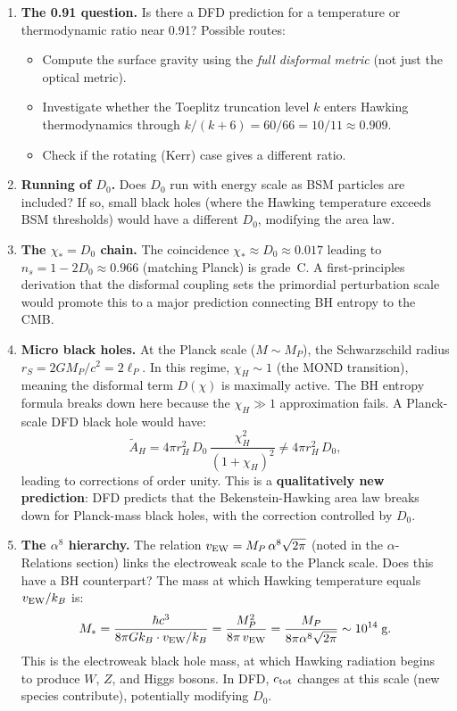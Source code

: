 \documentclass[11pt,a4paper]{article}
\begin{document}
\begin{enumerate}
\item \textbf{The 0.91 question.} Is there a DFD prediction for a temperature or thermodynamic ratio near 0.91? Possible routes:
\begin{itemize}
\item Compute the surface gravity using the \emph{full disformal metric} (not just the optical metric).
\item Investigate whether the Toeplitz truncation level $k$ enters Hawking thermodynamics through $k/(k+6) = 60/66 = 10/11 \approx 0.909$.
\item Check if the rotating (Kerr) case gives a different ratio.
\end{itemize}

\item \textbf{Running of $D_0$.} Does $D_0$ run with energy scale as BSM particles are included? If so, small black holes (where the Hawking temperature exceeds BSM thresholds) would have a different $D_0$, modifying the area law.

\item \textbf{The $\chi_* = D_0$ chain.} The coincidence $\chi_* \approx D_0 \approx 0.017$ leading to $n_s = 1 - 2D_0 \approx 0.966$ (matching Planck) is grade~C. A first-principles derivation that the disformal coupling sets the primordial perturbation scale would promote this to a major prediction connecting BH entropy to the CMB.

\item \textbf{Micro black holes.} At the Planck scale ($M \sim M_P$), the Schwarzschild radius $r_S = 2GM_P/c^2 = 2\ell_P$. In this regime, $\chi_H \sim 1$ (the MOND transition), meaning the disformal term $D(\chi)$ is maximally active. The BH entropy formula breaks down here because the $\chi_H \gg 1$ approximation fails. A Planck-scale DFD black hole would have:
\begin{equation}
\tilde{A}_H = 4\pi r_H^2\,D_0\,\frac{\chi_H^2}{(1+\chi_H)^2} \neq 4\pi r_H^2\,D_0,
\end{equation}
leading to corrections of order unity. This is a \textbf{qualitatively new prediction}: DFD predicts that the Bekenstein-Hawking area law breaks down for Planck-mass black holes, with the correction controlled by $D_0$.

\item \textbf{The $\alpha^8$ hierarchy.} The relation $v_{\rm EW} = M_P\,\alpha^8\sqrt{2\pi}$ (noted in the $\alpha$-Relations section) links the electroweak scale to the Planck scale. Does this have a BH counterpart? The mass at which Hawking temperature equals $v_{\rm EW}/k_B$ is:
\begin{equation}
M_* = \frac{\hbar c^3}{8\pi G k_B \cdot v_{\rm EW}/k_B} = \frac{M_P^2}{8\pi\,v_{\rm EW}} = \frac{M_P}{8\pi\alpha^8\sqrt{2\pi}} \sim 10^{14}\;\text{g}.
\end{equation}
This is the electroweak black hole mass, at which Hawking radiation begins to produce $W$, $Z$, and Higgs bosons. In DFD, $c_{\rm tot}$ changes at this scale (new species contribute), potentially modifying $D_0$.
\end{enumerate}
\end{document}
